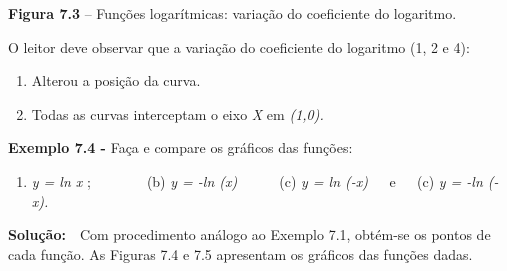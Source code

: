 \documentclass[12pt]{article}
\begin{document}

\par

\begin{Center}
\textbf{Figura 7.3} – Funções logarítmicas: variação do coeficiente do logaritmo.
\end{Center}\par


\vspace{\baselineskip}
\begin{adjustwidth}{0.39in}{0.0in}
O leitor deve observar que a variação do coeficiente do logaritmo (1, 2 e 4):\par

\end{adjustwidth}

\begin{enumerate}
	\item Alterou a posição da curva. \par

	\item Todas as curvas interceptam o eixo \textit{X} em \textit{(1,0).} 
\end{enumerate}\par


\vspace{\baselineskip}
\begin{adjustwidth}{0.75in}{0.0in}
\textbf{Exemplo 7.4 - }Faça e compare os gráficos das funções: \par

\end{adjustwidth}

\begin{enumerate}
	\item \textit{y = ln x} ;\ \ \ \ \ \ \ \ (b)  \textit{y = -ln (x)}\ \ \ \ \ \  \tab (c) \textit{y = ln (-x)\ \ \  }e\textit{\ \  }\  (c) \textit{y = -ln (-x).\  }\  
\end{enumerate}\par

\begin{adjustwidth}{0.69in}{0.0in}
\begin{justify}
\textbf{Solução:}\ \  Com procedimento análogo ao Exemplo 7.1, obtém-se os pontos de cada função. As Figuras 7.4 e 7.5 apresentam os gráficos das funções dadas.
\end{justify}\par

\end{adjustwidth}
\end{document}
